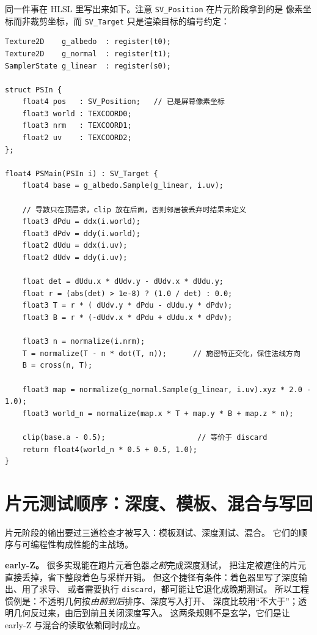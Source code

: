 \documentclass[12pt,a4paper,fontset=fandol]{ctexbook}
\newcommand{\Tp}[1]{\texttt{#1}}
\newcommand{\Lang}[1]{\textsf{#1}}
\newcommand{\HSL}{\Lang{HLSL}}
\begin{document}
同一件事在 \HSL{} 里写出来如下。注意 \Tp{SV\_Position} 在片元阶段拿到的是
像素坐标而非裁剪坐标，而 \Tp{SV\_Target} 只是渲染目标的编号约定：

\begin{lstlisting}[style=hlslstyle,caption={用 ddx、ddy 现场构造切平空间的等价写法},label={lst:ch02-hlsl-tbn}]
Texture2D    g_albedo  : register(t0);
Texture2D    g_normal  : register(t1);
SamplerState g_linear  : register(s0);

struct PSIn {
    float4 pos   : SV_Position;   // 已是屏幕像素坐标
    float3 world : TEXCOORD0;
    float3 nrm   : TEXCOORD1;
    float2 uv    : TEXCOORD2;
};

float4 PSMain(PSIn i) : SV_Target {
    float4 base = g_albedo.Sample(g_linear, i.uv);

    // 导数只在顶层求，clip 放在后面，否则邻居被丢弃时结果未定义
    float3 dPdu = ddx(i.world);
    float3 dPdv = ddy(i.world);
    float2 dUdu = ddx(i.uv);
    float2 dUdv = ddy(i.uv);

    float det = dUdu.x * dUdv.y - dUdv.x * dUdu.y;
    float r = (abs(det) > 1e-8) ? (1.0 / det) : 0.0;
    float3 T = r * ( dUdv.y * dPdu - dUdu.y * dPdv);
    float3 B = r * (-dUdv.x * dPdu + dUdu.x * dPdv);

    float3 n = normalize(i.nrm);
    T = normalize(T - n * dot(T, n));      // 施密特正交化，保住法线方向
    B = cross(n, T);

    float3 map = normalize(g_normal.Sample(g_linear, i.uv).xyz * 2.0 - 1.0);
    float3 world_n = normalize(map.x * T + map.y * B + map.z * n);

    clip(base.a - 0.5);                     // 等价于 discard
    return float4(world_n * 0.5 + 0.5, 1.0);
}
\end{lstlisting}

\section{片元测试顺序：深度、模板、混合与写回}

片元阶段的输出要过三道检查才被写入：模板测试、深度测试、混合。
它们的顺序与可编程性构成性能的主战场。

\textbf{early-Z。} 很多实现能在跑片元着色器\emph{之前}完成深度测试，
把注定被遮住的片元直接丢掉，省下整段着色与采样开销。
但这个捷径有条件：着色器里写了深度输出、用了求导、
或者需要执行 \Tp{discard}，都可能让它退化成晚期测试。
所以工程惯例是：不透明几何按\emph{由前到后}排序、深度写入打开、
深度比较用``不大于''；透明几何反过来，由后到前且关闭深度写入。
这两条规则不是玄学，它们是让 early-Z 与混合的读取依赖同时成立。
\end{document}
